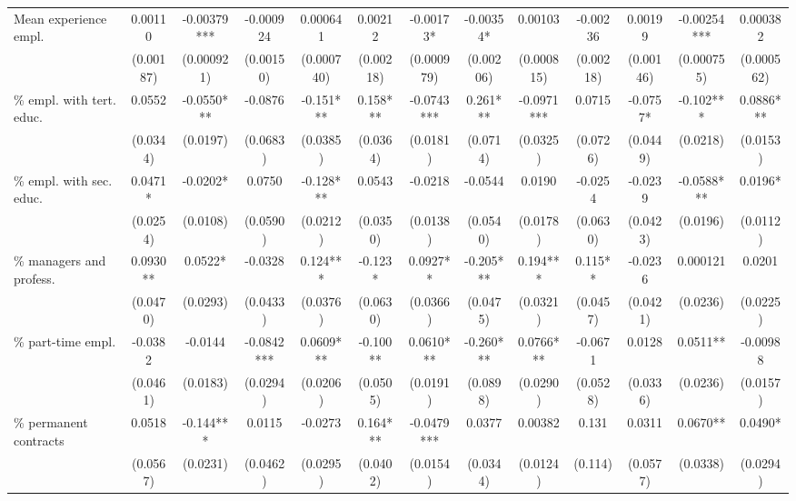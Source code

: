 \begin{threeparttable}
\begin{tabular}{l*{12}{S}}
Mean experience empl.     &  0.00110   & -0.00379*** & -0.000924  & 0.000641   & 0.00212   & -0.00173*  & -0.00354*  & 0.00103    & -0.00236  & 0.00199   & -0.00254*** & 0.000382   \\
                          &  (0.00187) & (0.000921)  & (0.00150)  & (0.000740) & (0.00218) & (0.000979) & (0.00206)  & (0.000815) & (0.00218) & (0.00146) & (0.000755)  & (0.000562) \\[1ex]
\% empl. with tert. educ. &  0.0552    & -0.0550***  & -0.0876    & -0.151***  & 0.158***  & -0.0743*** & 0.261***   & -0.0971*** & 0.0715    & -0.0757*  & -0.102***   & 0.0886***  \\
                          &  (0.0344)  & (0.0197)    & (0.0683)   & (0.0385)   & (0.0364)  & (0.0181)   & (0.0714)   & (0.0325)   & (0.0726)  & (0.0449)  & (0.0218)    & (0.0153)   \\[1ex]
\% empl. with sec. educ.  &  0.0471*   & -0.0202*    & 0.0750     & -0.128***  & 0.0543    & -0.0218    & -0.0544    & 0.0190     & -0.0254   & -0.0239   & -0.0588***  & 0.0196*    \\
                          &  (0.0254)  & (0.0108)    & (0.0590)   & (0.0212)   & (0.0350)  & (0.0138)   & (0.0540)   & (0.0178)   & (0.0630)  & (0.0423)  & (0.0196)    & (0.0112)   \\[1ex]
\% managers and profess.  &  0.0930**  & 0.0522*     & -0.0328    & 0.124***   & -0.123*   & 0.0927**   & -0.205***  & 0.194***   & 0.115**   & -0.0236   & 0.000121    & 0.0201     \\
                          &  (0.0470)  & (0.0293)    & (0.0433)   & (0.0376)   & (0.0630)  & (0.0366)   & (0.0475)   & (0.0321)   & (0.0457)  & (0.0421)  & (0.0236)    & (0.0225)   \\[1ex]
\% part-time empl.        &  -0.0382   & -0.0144     & -0.0842*** & 0.0609***  & -0.100**  & 0.0610***  & -0.260***  & 0.0766***  & -0.0671   & 0.0128    & 0.0511**    & -0.00988   \\
                          &  (0.0461)  & (0.0183)    & (0.0294)   & (0.0206)   & (0.0505)  & (0.0191)   & (0.0898)   & (0.0290)   & (0.0528)  & (0.0336)  & (0.0236)    & (0.0157)   \\[1ex]
\% permanent contracts    &  0.0518    & -0.144***   & 0.0115     & -0.0273    & 0.164***  & -0.0479*** & 0.0377     & 0.00382    & 0.131     & 0.0311    & 0.0670**    & 0.0490*    \\
                          &  (0.0567)  & (0.0231)    & (0.0462)   & (0.0295)   & (0.0402)  & (0.0154)   & (0.0344)   & (0.0124)   & (0.114)   & (0.0577)  & (0.0338)    & (0.0294)   \\[1ex]


\end{tabular}
\end{threeparttable}
